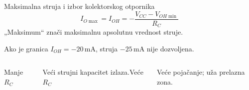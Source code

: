\begin{frame}[label=10-s024]{Maksimalna struja i izbor kolektorskog otpornika}
\setlength{\abovedisplayskip}{4pt}\setlength{\belowdisplayskip}{4pt}\setlength{\abovedisplayshortskip}{3pt}\setlength{\belowdisplayshortskip}{3pt}
\[I_{O\max}=I_{OH}=-\frac{V_{CC}-V_{OH\min}}{R_C}\]
„Maksimum“ znači maksimalnu apsolutnu vrednost struje.\par
Ako je granica $I_{OH}=-20\,\mathrm{mA}$, struja $-25\,\mathrm{mA}$ nije dozvoljena.\par\bigskip\begin{columns}[T,onlytextwidth]\textcolor{DEcrvena}{Manje $R_C$}\par\medskip
Veći strujni kapacitet izlaza.\centering \textcolor{DEcrvena}{Veće $R_C$}\par\medskip
Veće pojačanje; uža prelazna zona.\end{columns}\bigskip{}
\end{frame}
